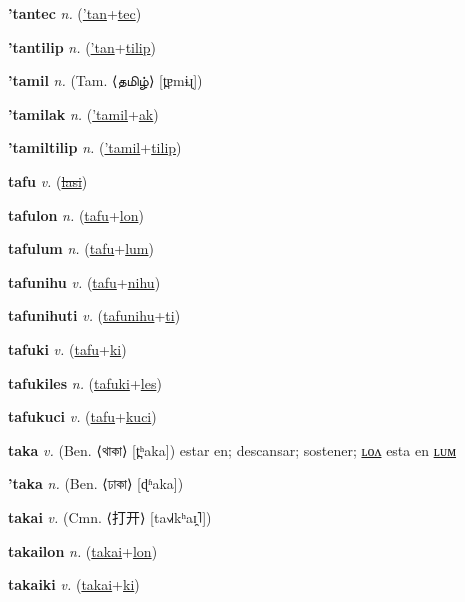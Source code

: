 \textbf{\hypertarget{'tantec}{'tantec}} \textit{n.} (\hyperlink{'tan}{'tan}+\allowbreak \hyperlink{tec}{tec})


\textbf{\hypertarget{'tantilip}{'tantilip}} \textit{n.} (\hyperlink{'tan}{'tan}+\allowbreak \hyperlink{tilip}{tilip})


\textbf{\hypertarget{'tamil}{'tamil}} \textit{n.} (Tam. ⟨{\tamil{}தமிழ்}⟩ [t̪ɐmɨɻ])


\textbf{\hypertarget{'tamilak}{'tamilak}} \textit{n.} (\hyperlink{'tamil}{'tamil}+\allowbreak \hyperlink{ak}{ak})


\textbf{\hypertarget{'tamiltilip}{'tamiltilip}} \textit{n.} (\hyperlink{'tamil}{'tamil}+\allowbreak \hyperlink{tilip}{tilip})


\textbf{\hypertarget{tafu}{tafu}} \textit{v.} (\hyperlink{lasi}{\sout{lasi}})


\textbf{\hypertarget{tafulon}{tafulon}} \textit{n.} (\hyperlink{tafu}{tafu}+\allowbreak \hyperlink{lon}{lon})


\textbf{\hypertarget{tafulum}{tafulum}} \textit{n.} (\hyperlink{tafu}{tafu}+\allowbreak \hyperlink{lum}{lum})


\textbf{\hypertarget{tafunihu}{tafunihu}} \textit{v.} (\hyperlink{tafu}{tafu}+\allowbreak \hyperlink{nihu}{nihu})


\textbf{\hypertarget{tafunihuti}{tafunihuti}} \textit{v.} (\hyperlink{tafunihu}{tafunihu}+\allowbreak \hyperlink{ti}{ti})


\textbf{\hypertarget{tafuki}{tafuki}} \textit{v.} (\hyperlink{tafu}{tafu}+\allowbreak \hyperlink{ki}{ki})


\textbf{\hypertarget{tafukiles}{tafukiles}} \textit{n.} (\hyperlink{tafuki}{tafuki}+\allowbreak \hyperlink{les}{les})


\textbf{\hypertarget{tafukuci}{tafukuci}} \textit{v.} (\hyperlink{tafu}{tafu}+\allowbreak \hyperlink{kuci}{kuci})


\textbf{\hypertarget{taka}{taka}} \textit{v.} (Ben. ⟨{\bengali{}থাকা}⟩ [t̪ʰaka])
estar en; descansar; sostener; \hyperlink{takalon}{ʟᴏᴧ} esta en \hyperlink{takalum}{ʟᴜᴍ}

\textbf{\hypertarget{'taka}{'taka}} \textit{n.} (Ben. ⟨{\bengali{}ঢাকা}⟩ [ɖʱaka])


\textbf{\hypertarget{takai}{takai}} \textit{v.} (Cmn. ⟨{\chinese{}打开}⟩ [ta˧˩˧kʰaɪ̯˥])


\textbf{\hypertarget{takailon}{takailon}} \textit{n.} (\hyperlink{takai}{takai}+\allowbreak \hyperlink{lon}{lon})


\textbf{\hypertarget{takaiki}{takaiki}} \textit{v.} (\hyperlink{takai}{takai}+\allowbreak \hyperlink{ki}{ki})


